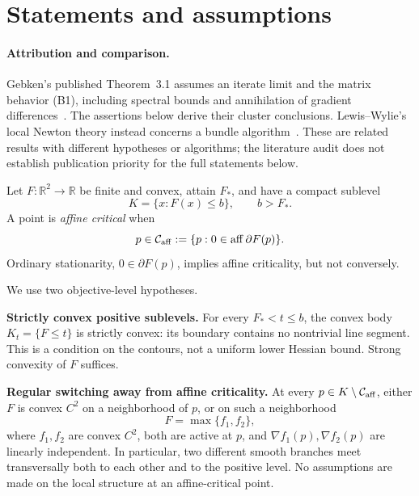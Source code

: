 \begingroup
\providecommand{\R}{}
\renewcommand{\R}{\mathbb R}
\providecommand{\aff}{}
\renewcommand{\aff}{\operatorname{aff}}
\providecommand{\conv}{}
\renewcommand{\conv}{\operatorname{conv}}
\providecommand{\tr}{}
\renewcommand{\tr}{\operatorname{tr}}
\providecommand{\dist}{}
\renewcommand{\dist}{\operatorname{dist}}
\providecommand{\Ca}{}
\renewcommand{\Ca}{\mathcal C_{\rm aff}}
\providecommand{\ip}{}
\renewcommand{\ip}[2]{\langle #1,#2\rangle}
\providecommand{\norm}{}
\renewcommand{\norm}[1]{\lVert #1\rVert}
\makeatletter\let\c@lemma\c@theorem\let\c@corollary\c@theorem\let\c@proposition\c@theorem\let\c@remark\c@theorem\makeatother
\renewcommand{\thelemma}{\thetheorem}\renewcommand{\thecorollary}{\thetheorem}\renewcommand{\theproposition}{\thetheorem}\renewcommand{\theremark}{\thetheorem}
\setcounter{section}{0}
\setcounter{theorem}{0}
\setcounter{equation}{0}
\section{Statements and assumptions}
\paragraph{Attribution and comparison.}
Gebken's published Theorem~3.1 assumes an iterate limit and the matrix behavior (B1), including spectral bounds and annihilation of gradient differences~\cite{BG}. The assertions below derive their cluster conclusions. Lewis--Wylie's local Newton theory instead concerns a bundle algorithm~\cite{LW}. These are related results with different hypotheses or algorithms; the literature audit does not establish publication priority for the full statements below.

Let $F:\R^2\to\R$ be finite and convex, attain $F_*$, and have a compact sublevel
\[
K=\{x:F(x)\le b\},\qquad b>F_*.
\]
A point is \emph{affine critical} when
\[
 p\in\Ca:=\{p:0\in\aff\partial F(p)\}.
\]
Ordinary stationarity, $0\in\partial F(p)$, implies affine criticality, but not conversely.

We use two objective-level hypotheses.

\textbf{Strictly convex positive sublevels.} For every $F_*<t\le b$, the convex body $K_t=\{F\le t\}$ is strictly convex: its boundary contains no nontrivial line segment. This is a condition on the contours, not a uniform lower Hessian bound. Strong convexity of $F$ suffices.

\textbf{Regular switching away from affine criticality.} At every $p\in K\setminus\Ca$, either $F$ is convex $C^2$ on a neighborhood of $p$, or on such a neighborhood
\[
 F=\max\{f_1,f_2\},
\]
where $f_1,f_2$ are convex $C^2$, both are active at $p$, and $\nabla f_1(p),\nabla f_2(p)$ are linearly independent. In particular, two different smooth branches meet transversally both to each other and to the positive level. No assumptions are made on the local structure at an affine-critical point.

